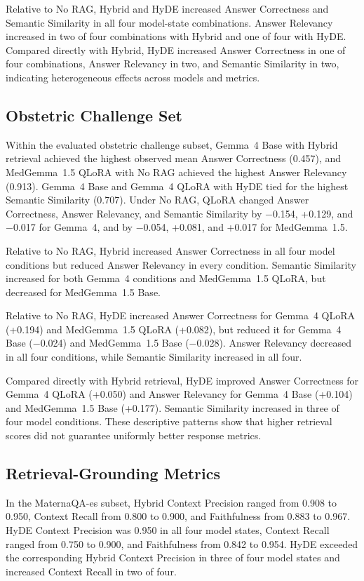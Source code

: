 Relative to No RAG, Hybrid and HyDE increased Answer Correctness and Semantic
Similarity in all four model-state combinations. Answer Relevancy increased
in two of four combinations with Hybrid and one of four with HyDE. Compared
directly with Hybrid, HyDE increased Answer Correctness in one of four
combinations, Answer Relevancy in two, and Semantic Similarity in two,
indicating heterogeneous effects across models and metrics.

\subsection{Obstetric Challenge Set}
Within the evaluated obstetric challenge subset, Gemma~4 Base with Hybrid
retrieval achieved the highest observed mean Answer Correctness (0.457), and
MedGemma~1.5 QLoRA with No RAG achieved the highest Answer Relevancy (0.913).
Gemma~4 Base and Gemma~4 QLoRA with HyDE tied for the highest Semantic
Similarity (0.707). Under No RAG, QLoRA changed Answer Correctness, Answer
Relevancy, and Semantic Similarity by $-$0.154, +0.129, and $-$0.017 for
Gemma~4, and by $-$0.054, +0.081, and +0.017 for MedGemma~1.5.

Relative to No RAG, Hybrid increased Answer Correctness in all four model
conditions but reduced Answer Relevancy in every condition. Semantic
Similarity increased for both Gemma~4 conditions and MedGemma~1.5 QLoRA, but
decreased for MedGemma~1.5 Base.

Relative to No RAG, HyDE increased Answer Correctness for Gemma~4 QLoRA
(+0.194) and MedGemma~1.5 QLoRA (+0.082), but reduced it for Gemma~4 Base
($-$0.024) and MedGemma~1.5 Base ($-$0.028). Answer Relevancy decreased in
all four conditions, while Semantic Similarity increased in all four.

Compared directly with Hybrid retrieval, HyDE improved Answer Correctness
for Gemma~4 QLoRA (+0.050) and Answer Relevancy for Gemma~4 Base (+0.104)
and MedGemma~1.5 Base (+0.177). Semantic Similarity increased in three of
four model conditions. These descriptive patterns show that higher retrieval
scores did not guarantee uniformly better response metrics.

\subsection{Retrieval-Grounding Metrics}
In the MaternaQA-es subset, Hybrid Context Precision ranged from 0.908 to
0.950, Context Recall from 0.800 to 0.900, and Faithfulness from 0.883 to
0.967. HyDE Context Precision was 0.950 in all four model states, Context
Recall ranged from 0.750 to 0.900, and Faithfulness from 0.842 to 0.954.
HyDE exceeded the corresponding Hybrid Context Precision in three of four
model states and increased Context Recall in two of four.

